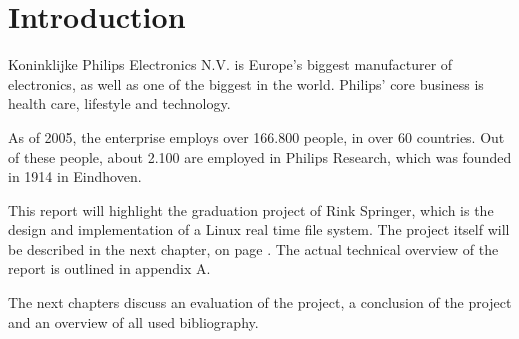 \chapter{Introduction}

Koninklijke Philips Electronics N.V. is Europe's biggest manufacturer of electronics, as well as one of the biggest in the world. Philips' core business is health care, lifestyle and technology.

As of 2005, the enterprise employs over 166.800 people, in over 60 countries. Out of these people, about 2.100 are employed in Philips Research, which was founded in 1914 in Eindhoven.

This report will highlight the graduation project of Rink Springer, which is the design and implementation of a Linux real time file system. The project itself will be described in the next chapter, on page \pageref{project}. The actual technical overview of the report is outlined in appendix A.

The next chapters discuss an evaluation of the project, a conclusion of the project and an overview of all used bibliography.
